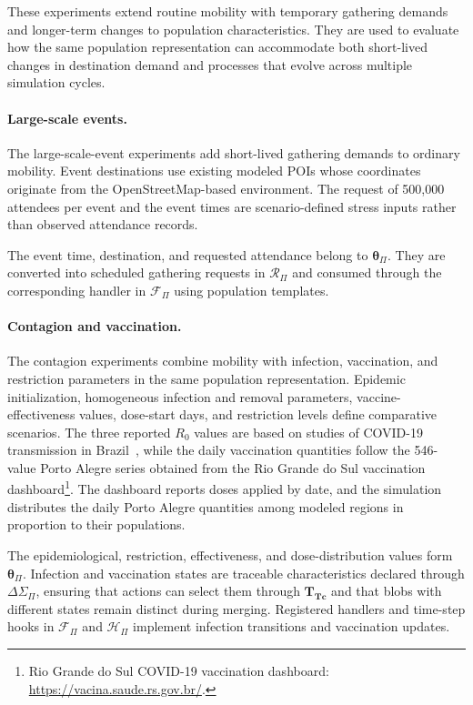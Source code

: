 These experiments extend routine mobility with temporary gathering demands and longer-term changes to population characteristics. They are used to evaluate how the same population representation can accommodate both short-lived changes in destination demand and processes that evolve across multiple simulation cycles.

\paragraph{Large-scale events.}
The large-scale-event experiments add short-lived gathering demands to ordinary mobility. Event destinations use existing modeled POIs whose coordinates originate from the OpenStreetMap-based environment. The request of 500,000 attendees per event and the event times are scenario-defined stress inputs rather than observed attendance records.

The event time, destination, and requested attendance belong to $\bm{\theta}_{\Pi}$. They are converted into scheduled gathering requests in $\mathcal{R}_{\Pi}$ and consumed through the corresponding handler in $\mathcal{F}_{\Pi}$ using population templates.

\paragraph{Contagion and vaccination.}
The contagion experiments combine mobility with infection, vaccination, and restriction parameters in the same population representation. Epidemic initialization, homogeneous infection and removal parameters, vaccine-effectiveness values, dose-start days, and restriction levels define comparative scenarios. The three reported $R_0$ values are based on studies of COVID-19 transmission in Brazil~\cite{dutra2020covidR0,deSouza2020covirR0,dutra2021covidR0}, while the daily vaccination quantities follow the 546-value Porto Alegre series obtained from the Rio Grande do Sul vaccination dashboard\footnote{Rio Grande do Sul COVID-19 vaccination dashboard: \url{https://vacina.saude.rs.gov.br/}.}. The dashboard reports doses applied by date, and the simulation distributes the daily Porto Alegre quantities among modeled regions in proportion to their populations.

The epidemiological, restriction, effectiveness, and dose-distribution values form $\bm{\theta}_{\Pi}$. Infection and vaccination states are traceable characteristics declared through $\Delta\Sigma_{\Pi}$, ensuring that actions can select them through $\bm{T_{Tc}}$ and that blobs with different states remain distinct during merging. Registered handlers and time-step hooks in $\mathcal{F}_{\Pi}$ and $\mathcal{H}_{\Pi}$ implement infection transitions and vaccination updates.

